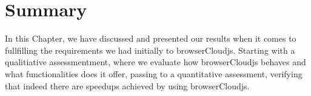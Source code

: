 \section{Summary}

In this Chapter, we have discussed and presented our results when it comes to fullfilling the requirements we had initially to browserCloudjs. Starting with a qualitiative assessmentment, where we evaluate how browserCloudjs behaves and what functionalities does it offer, passing to a quantitative assessment, verifying that indeed there are speedups achieved by using browserCloudjs.
